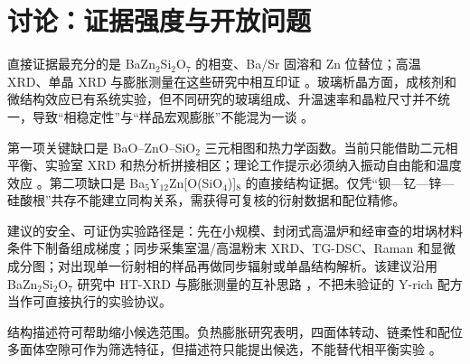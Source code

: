 \section{讨论：证据强度与开放问题}

直接证据最充分的是 BaZn$_2$Si$_2$O$_7$ 的相变、Ba/Sr 固溶和 Zn 位替位；高温 XRD、单晶 XRD 与膨胀测量在这些研究中相互印证 \cite{lin1999phase,thieme2015ba1,kerstan2012thermal,thieme2016new}。玻璃析晶方面，成核剂和微结构效应已有系统实验，但不同研究的玻璃组成、升温速率和晶粒尺寸并不统一，导致“相稳定性”与“样品宏观膨胀”不能混为一谈 \cite{thieme2016thermal,vladislavova2018crystallisation}。

第一项关键缺口是 BaO--ZnO--SiO$_2$ 三元相图和热力学函数。当前只能借助二元相平衡、实验室 XRD 和热分析拼接相区；理论工作提示必须纳入振动自由能和温度效应 \cite{erlebach2021phase}。第二项缺口是 Ba$_5$Y$_{12}$Zn[O(SiO$_4$)]$_8$ 的直接结构证据。仅凭“钡—钇—锌—硅酸根”共存不能建立同构关系，需获得可复核的衍射数据和配位精修。

建议的安全、可证伪实验路径是：先在小规模、封闭式高温炉和经审查的坩埚材料条件下制备组成梯度；同步采集室温/高温粉末 XRD、TG-DSC、Raman 和显微成分图；对出现单一衍射相的样品再做同步辐射或单晶结构解析。该建议沿用 BaZn$_2$Si$_2$O$_7$ 研究中 HT-XRD 与膨胀测量的互补思路 \cite{kerstan2012thermal,thieme2016very}，不把未验证的 Y-rich 配方当作可直接执行的实验协议。

结构描述符可帮助缩小候选范围。负热膨胀研究表明，四面体转动、链柔性和配位多面体空隙可作为筛选特征，但描述符只能提出候选，不能替代相平衡实验 \cite{kireeva2022pauling,erlebach2021phase}。
